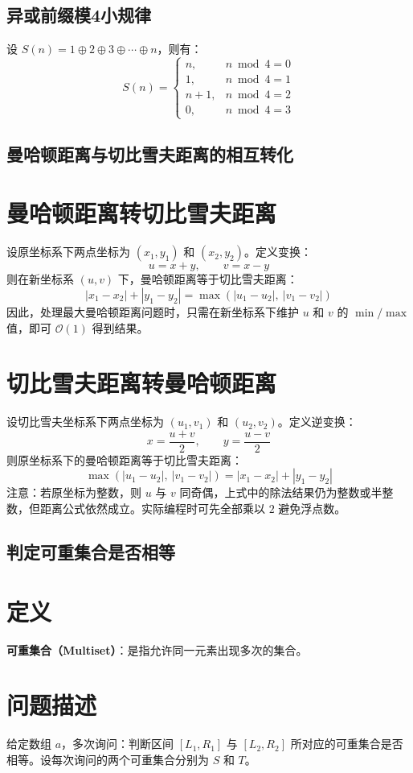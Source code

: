 \documentclass[11pt,a4paper,twocolumn]{ctexart}  %
\begin{document}
\subsection{异或前缀模4小规律}

设 $S(n) = 1 \oplus 2 \oplus 3 \oplus \cdots \oplus n$，则有：
\[
S(n) =
\begin{cases}
n,      & n \bmod 4 = 0 \\
1,      & n \bmod 4 = 1 \\
n+1,    & n \bmod 4 = 2 \\
0,      & n \bmod 4 = 3
\end{cases}
\]

\subsection{曼哈顿距离与切比雪夫距离的相互转化}

\section*{曼哈顿距离转切比雪夫距离}
设原坐标系下两点坐标为 $(x_1, y_1)$ 和 $(x_2, y_2)$。定义变换：
\[
u = x + y,\qquad v = x - y
\]
则在新坐标系 $(u, v)$ 下，曼哈顿距离等于切比雪夫距离：
\[
|x_1 - x_2| + |y_1 - y_2| = \max(|u_1 - u_2|,\ |v_1 - v_2|)
\]
因此，处理最大曼哈顿距离问题时，只需在新坐标系下维护 $u$ 和 $v$ 的 $\min/\max$ 值，即可 $\mathcal{O}(1)$ 得到结果。

\section*{切比雪夫距离转曼哈顿距离}
设切比雪夫坐标系下两点坐标为 $(u_1, v_1)$ 和 $(u_2, v_2)$。定义逆变换：
\[
x = \frac{u + v}{2},\qquad y = \frac{u - v}{2}
\]
则原坐标系下的曼哈顿距离等于切比雪夫距离：
\[
\max(|u_1 - u_2|,\ |v_1 - v_2|) = |x_1 - x_2| + |y_1 - y_2|
\]
注意：若原坐标为整数，则 $u$ 与 $v$ 同奇偶，上式中的除法结果仍为整数或半整数，但距离公式依然成立。实际编程时可先全部乘以 $2$ 避免浮点数。

\subsection{判定可重集合是否相等}
\section*{定义}
\textbf{可重集合（Multiset）}：是指允许同一元素出现多次的集合。

\section*{问题描述}
给定数组 $a$，多次询问：判断区间 $[L_1,R_1]$ 与 $[L_2,R_2]$ 所对应的可重集合是否相等。设每次询问的两个可重集合分别为 $S$ 和 $T$。
\end{document}
